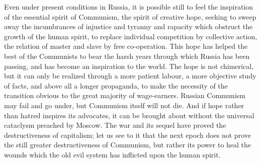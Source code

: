 Even under present conditions in Russia, it is possible still to feel the inspiration of the essential spirit of Communism, the spirit of creative hope, seeking to sweep away the incumbrances of injustice and tyranny and rapacity which obstruct the growth of the human spirit, to replace individual competition by collective action, the relation of master and slave by free co-operation. This hope has helped the best of the Communists to bear the harsh years through which Russia has been passing, and has become an inspiration to the world. The hope is not chimerical, but it can only be realized through a more patient labour, a more objective study of facts, and above all a longer propaganda, to make the necessity of the transition obvious to the great majority of wage-earners. Russian Communism may fail and go under, but Communism itself will not die. And if hope rather than hatred inspires its advocates, it can be brought about without the universal cataclysm preached by Moscow. The war and its sequel have proved the destructiveness of capitalism; let us see to it that the next epoch does not prove the still greater destructiveness of Communism, but rather its power to heal the wounds which the old evil system has inflicted upon the human spirit.

